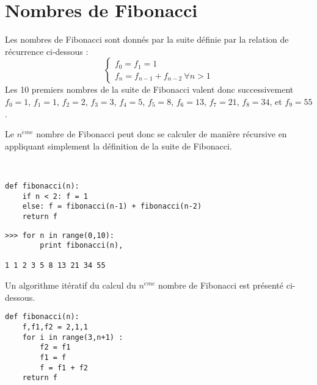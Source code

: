 \section*{Nombres de Fibonacci}
Les nombres de Fibonacci sont donnés par la suite définie par la relation de récurrence ci-dessous :
$$ \left\{\begin{array}{l}
f_0 = f_1 = 1\\
f_n = f_{n-1} + f_{n-2}\ \forall n > 1
\end{array}\right.$$
Les 10 premiers nombres de la suite de Fibonacci valent donc
successivement $f_0 = 1$, $f_1 = 1$, $f_2 = 2$, $f_3 = 3$, 
$f_4 = 5$, $f_5 = 8$, $f_6 = 13$, $f_7 = 21$, $f_8 = 34$, et $f_9 = 55$.

Le $n^{\grave eme}$ nombre de Fibonacci peut donc se calculer de manière récursive en 
appliquant simplement la définition de la suite de Fibonacci.

\mbox{}\ \ \begin{py}{8cm}
\begin{verbatim}
def fibonacci(n):
    if n < 2: f = 1
    else: f = fibonacci(n-1) + fibonacci(n-2)
    return f
\end{verbatim}
\end{py}
\hfill
\begin{py}{5cm}
\begin{verbatim}
>>> for n in range(0,10): 
        print fibonacci(n),

1 1 2 3 5 8 13 21 34 55
\end{verbatim}
\end{py}
\vspace*{2mm}

\noindent Un algorithme itératif du calcul du $n^{\grave eme}$ nombre de 
Fibonacci est présenté ci-dessous.

\begin{lstlisting}[caption={\bf Nombres de Fibonacci},label=cl:fibonacci]
def fibonacci(n):
    f,f1,f2 = 2,1,1
    for i in range(3,n+1) :
        f2 = f1
        f1 = f
        f = f1 + f2
    return f
\end{lstlisting}

